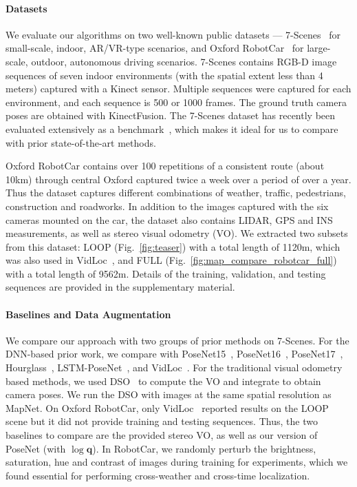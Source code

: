  
\paragraph{Datasets} We evaluate our algorithms on two well-known public datasets ---
7-Scenes~\cite{Shotton13Scene7} for small-scale, indoor, AR/VR-type
scenarios, and Oxford RobotCar~\cite{RobotCarDatasetIJRR} for
large-scale, outdoor, autonomous driving scenarios. 7-Scenes contains RGB-D image sequences of seven indoor
environments (with the spatial extent less than 4 meters) captured with a
Kinect sensor. Multiple sequences were captured for each environment, and each
sequence is 500 or 1000 frames. The ground truth camera poses are
obtained with KinectFusion. The 7-Scenes dataset has recently
been  evaluated extensively as a benchmark~\cite{Kendall15iccv, Kendall16icra,
Kendall17cvpr,
Melekhov17Hourglass,Walch17LSTM,Clark17VidLoc,Brachmann17RANSAC}, which makes
it ideal for us to compare with prior state-of-the-art methods.


Oxford RobotCar contains over 100 repetitions of a consistent route (about 10km)
through central Oxford captured twice a week over a period of over a year. Thus
the dataset captures different combinations of weather, traffic, pedestrians,
construction and roadworks. In addition to the images captured with the six
cameras mounted on the car, the dataset also contains LIDAR, GPS and INS
measurements, as well as stereo visual odometry (VO).
We extracted two subsets from this dataset: LOOP (Fig.~\ref{fig:teaser})
with a total length of 1120m, which was also used in VidLoc~\cite{Clark17VidLoc}, and
FULL (Fig.~\ref{fig:map_compare_robotcar_full}) with a total length
of 9562m. Details of the training, validation, and testing sequences are provided
in the supplementary material.

\vspace{-1em}
\paragraph{Baselines and Data Augmentation}

We compare our approach with two groups of prior methods on 7-Scenes. For the DNN-based
prior work, we compare with PoseNet15~\cite{Kendall15iccv},
PoseNet16~\cite{Kendall16icra}, PoseNet17~\cite{Kendall17cvpr},
Hourglass~\cite{Melekhov17Hourglass}, LSTM-PoseNet~\cite{Walch17LSTM}, and
VidLoc~\cite{Clark17VidLoc}.  For the traditional visual odometry based
methods, we used DSO~\cite{Engel2017DSO} to compute the VO and integrate to obtain camera poses. We run the DSO with images at the same spatial resolution as 
MapNet. On Oxford RobotCar, only VidLoc~\cite{Clark17VidLoc} reported
results on the LOOP scene but it did not provide training and
testing sequences. Thus, the two baselines to compare are 
the provided stereo VO, as well as our version of
PoseNet (with $\log\mathbf{q}$). In RobotCar, we randomly perturb the brightness,
saturation, hue and contrast of images during training for experiments, which
we found essential for performing cross-weather and cross-time
localization. 




